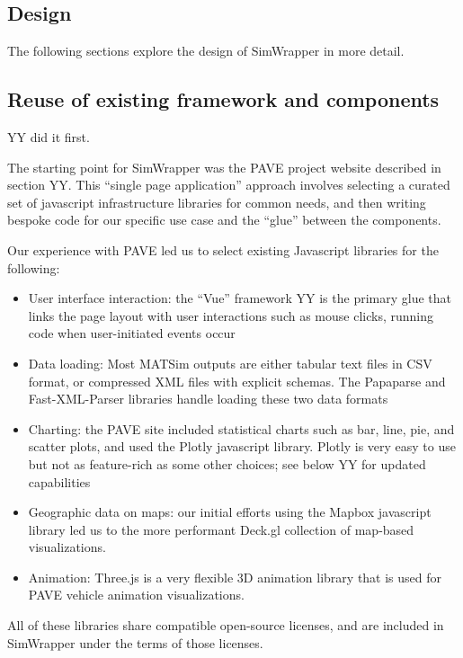 \documentclass[3p,times,procedia]{elsarticle}
\begin{document}
\subsection{Design}


The following sections explore the design of SimWrapper in more detail.

\subsection{Reuse of existing framework and components}

YY \cite{CharltonLaudan2020WebBasedVisualization} did it first.

The starting point for SimWrapper was the PAVE project website described in section YY. This ``single page application'' approach involves selecting a curated set of javascript infrastructure libraries for common needs, and then writing bespoke code for our specific use case and the ``glue'' between the components.

Our experience with PAVE led us to select existing Javascript libraries for the following:

\begin{itemize}
\item
  User interface interaction: the ``Vue'' framework YY is the primary
  glue that links the page layout with user interactions such as mouse
  clicks, running code when user-initiated events occur
\item
  Data loading: Most MATSim outputs are either tabular text files in CSV
  format, or compressed XML files with explicit schemas. The Papaparse
  and Fast-XML-Parser libraries handle loading these two data formats
\item
  Charting: the PAVE site included statistical charts such as bar, line, pie, and scatter plots, and used the Plotly javascript library. Plotly is very easy to use but not as feature-rich as some other choices; see below YY for updated capabilities
\item
  Geographic data on maps: our initial efforts using the Mapbox
  javascript library led us to the more performant Deck.gl collection of
  map-based visualizations.
\item
  Animation: Three.js is a very flexible 3D animation library that is
  used for PAVE vehicle animation visualizations.
\end{itemize}

All of these libraries share compatible open-source licenses, and are
included in SimWrapper under the terms of those licenses.
\end{document}
